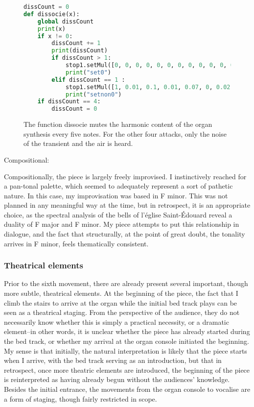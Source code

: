 \documentclass[12pt,twoside,maitrise]{dms}
\theoremstyle{definition}
\begin{document}
\begin{figure}[H]
\begin{lstlisting}[language=Python]
dissCount = 0
def dissocie(x):
    global dissCount
    print(x)
    if x != 0:
        dissCount += 1
        print(dissCount)
        if dissCount > 1:
            stop1.setMul([0, 0, 0, 0, 0, 0, 0, 0, 0, 0, 0, 0, 0, 0, 0, 0, 0, 0, 0, 0])
            print("set0")
        elif dissCount == 1 :
            stop1.setMul([1, 0.01, 0.1, 0.01, 0.07, 0, 0.02, 0, 0.01, 0, 0.003, 0, 0.003, 0, 0.001, 0, 0.001, 0, 0.001, 0])
            print("setnon0")
    if dissCount == 4:
        dissCount = 0
\end{lstlisting}
\caption{The function dissocie mutes the harmonic content of the organ synthesis every five notes.
For the other four attacks, only the noise of the transient and the air is heard.}
\end{figure}

Compositional:

Compositionally, the piece is largely freely improvised.
I instinctively reached for a pan-tonal palette, which seemed to adequately represent a sort of pathetic nature.
In this case, my improvisation was based in F minor.
This was not planned in any meaningful way at the time, but in retrospect, it is an appropriate choice, as the spectral analysis of the bells of l'église Saint-Édouard reveal a duality of F major and F minor.
My piece attempts to put this relationship in dialogue, and the fact that structurally, at the point of great doubt, the tonality arrives in F minor, feels thematically consistent.

\subsubsection{Theatrical elements}

Prior to the sixth movement, there are already present several important, though more subtle, theatrical elements.
At the beginning of the piece, the fact that I climb the stairs to arrive at the organ while the initial bed track plays can be seen as a theatrical staging.
From the perspective of the audience, they do not necessarily know whether this is simply a practical necessity, or a dramatic element--in other words, it is unclear whether the piece has already started during the bed track, or whether my arrival at the organ console initiated the beginning.
My sense is that initially, the natural interpretation is likely that the piece starts when I arrive, with the bed track serving as an introduction, but that in retrospect, once more theatric elements are introduced, the beginning of the piece is reinterpreted as having already begun without the audiences' knowledge.
Besides the initial entrance, the movements from the organ console to vocalise are a form of staging, though fairly restricted in scope.
\end{document}
